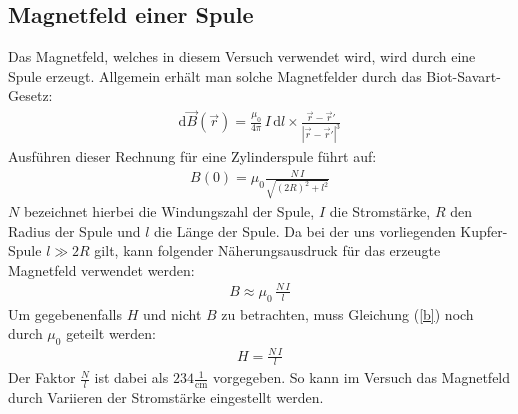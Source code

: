 \documentclass[german,  %
parskip=full,  %
]{scrartcl}
\begin{document}
\subsection{Magnetfeld einer Spule}
Das Magnetfeld, welches in diesem Versuch verwendet wird, wird durch eine Spule erzeugt. Allgemein erhält man solche Magnetfelder durch das Biot-Savart-Gesetz:
\begin{align}
\text{d}\vec{B}(\vec{r}) = \frac{\mu_{0}}{4\pi} \, I \, \text{d}l \times \frac{\vec{r}- \vec{r}'}{|\vec{r}- \vec{r}'|^3}
\end{align}
Ausführen dieser Rechnung für eine Zylinderspule führt auf:
\begin{align}
B(0) = \mu_{0} \frac{N\,I}{\sqrt{(2R)^2+l^2}}
\end{align}
$N$ bezeichnet hierbei die Windungszahl der Spule, $I$ die Stromstärke, $R$ den Radius der Spule und $l$ die Länge der Spule. Da bei der uns vorliegenden Kupfer-Spule $l \gg 2R$ gilt, kann folgender Näherungsausdruck für das erzeugte Magnetfeld verwendet werden:
\begin{align}
\label{b}
B \approx \mu_{0} \, \frac{N \, I}{l}
\end{align}
Um gegebenenfalls $H$ und nicht $B$ zu betrachten, muss Gleichung (\ref{b}) noch durch $\mu_0$ geteilt werden:
\begin{align}
H = \frac{N \, I}{l}
\end{align}
Der Faktor $\frac{N}{l}$ ist dabei als $234 \frac{1}{\text{cm}}$ vorgegeben. So kann im Versuch das Magnetfeld durch Variieren der Stromstärke eingestellt werden.
\end{document}
